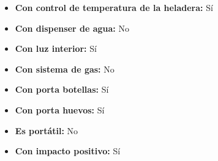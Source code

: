 \documentclass{article}
\begin{document}
\begin{adjustwidth}{2em}{}
\begin{itemize}
\begin{itemize}
    \item \textbf {Con control de temperatura de la heladera:} Sí
    \item \textbf {Con dispenser de agua:} No
    \item \textbf {Con luz interior:} Sí
    \item \textbf {Con sistema de gas:} No
    \item \textbf {Con porta botellas:} Sí
    \item \textbf {Con porta huevos:} Sí
    \item \textbf {Es portátil:} No
    \item \textbf {Con impacto positivo:} Sí
        \end{itemize}
    \end{itemize}

    \vspace{1\baselineskip} %
    \end{adjustwidth}
\end{document}

